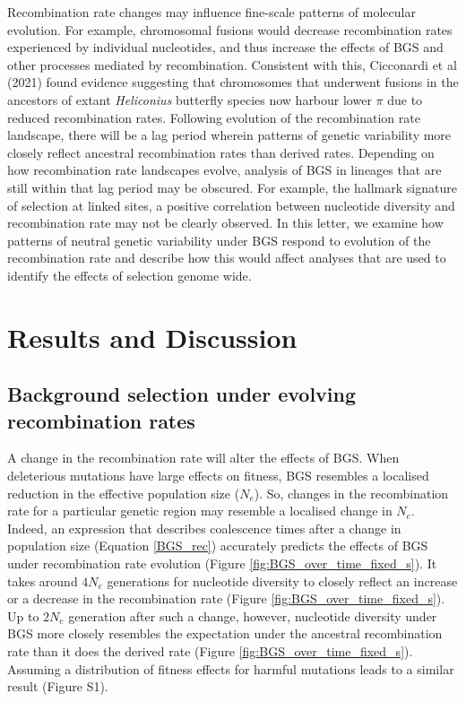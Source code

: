 \documentclass[10pt,twoside, twocolumn]{GSA_format}
\begin{document}
\vspace{5px}

Recombination rate changes may influence fine-scale patterns of molecular evolution. For example, chromosomal fusions would decrease recombination rates experienced by individual nucleotides, and thus increase the effects of BGS and other processes mediated by recombination. Consistent with this, Cicconardi et al (2021) found evidence suggesting that chromosomes that underwent fusions in the ancestors of extant \textit{Heliconius} butterfly species now harbour lower $\pi$ due to reduced recombination rates. Following evolution of the recombination rate landscape, there will be a lag period wherein patterns of genetic variability more closely reflect ancestral recombination rates than derived rates. Depending on how recombination rate landscapes evolve, analysis of BGS in lineages that are still within that lag period may be obscured. For example, the hallmark signature of selection at linked sites, a positive correlation between nucleotide diversity and recombination rate may not be clearly observed. In this letter, we examine how patterns of neutral genetic variability under BGS respond to evolution of the recombination rate and describe how this would affect analyses that are used to identify the effects of selection genome wide. 

\section{Results and Discussion}

\subsection{Background selection under evolving recombination rates}

A change in the recombination rate will alter the effects of BGS. When deleterious mutations have large effects on fitness, BGS resembles a localised reduction in the effective population size ($N_e$). So, changes in the recombination rate for a particular genetic region may resemble a localised change in $N_e$. Indeed, an expression that describes coalescence times after a change in population size (Equation \ref{BGS_rec}) accurately predicts the effects of BGS under recombination rate evolution (Figure \ref{fig:BGS_over_time_fixed_s}). It takes around $4N_e$ generations for nucleotide diversity to closely reflect an increase or a decrease in the recombination rate (Figure \ref{fig:BGS_over_time_fixed_s}). Up to $2N_e$ generation after such a change, however, nucleotide diversity under BGS more closely resembles the expectation under the ancestral recombination rate than it does the derived rate (Figure \ref{fig:BGS_over_time_fixed_s}). Assuming a distribution of fitness effects for harmful mutations leads to a similar result (Figure S1).
\end{document}
